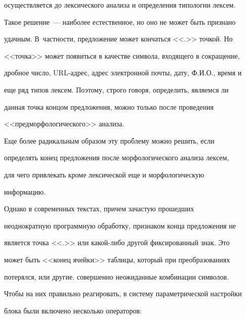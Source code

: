 осуществляется до лексического анализа и определения типологии лексем. 


Такое решение~--- наиболее естественное, но оно не может быть признано 


удачным. В~част\-ности, предложение может кончаться <<.>> точкой. Но 


<<точка>> может появиться в качестве  символа, входящего в сокращение, 


дробное число, URL-адрес, адрес электронной почты, дату, Ф.И.О., время  и 


еще ряд типов лексем. Поэтому,  строго говоря, определить, являемся ли 


данная точка концом предложения, можно только после проведения 


<<предморфологического>> анализа. 


   


   Еще более радикальным образом эту проблему можно решить, если 


определять конец предложения после морфологического анализа лексем, 


для чего привлекать кроме лексической еще и морфологическую 


информацию.


   


   Однако в современных текстах, причем зачастую прошедших 


неоднократную программную обработку, признаком конца предложения не 


является точка <<.>> или какой-либо другой фиксированный знак.  Это 


может быть <<конец ячейки>> таблицы, который при преобразованиях 


потерялся, или другие. совершенно неожиданные комбинации символов. 


Чтобы на них правильно реагировать, в систему параметрической настройки 


блока были включено несколько операторов:


